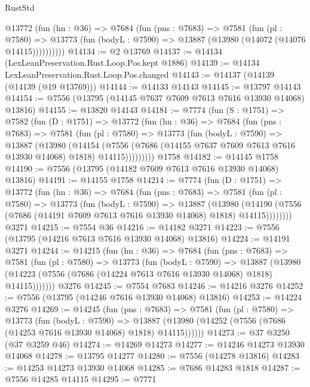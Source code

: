 \begin{lexlean}{RustStd}
\begin{coremodule}
{\begin{coremodule}
{{{{{{{{{{{{{{{{{{{{{{{{{{{{{{{{{{{{{{{{{{{        @13772
          (fun (hn : @36) =>
          @7684
            (fun (pns : @7683) =>
            @7581
              (fun (pl : @7580) =>
              @13773 (fun (bodyL : @7590) => @13887 (@13980 (@14072 (@14076 @14115))))))))))
@14134 := @2 @13769
@14137 := @14134 (LexLeanPreservation.Rust.Loop.Pos.kept @1886)
@14139 := @14134 LexLeanPreservation.Rust.Loop.Pos.changed
@14143 := @14137 (@14139 (@14139 (@19 @13769)))
@14144 := @14133 @14143
@14145 := @13797 @14143
@14154 := @7556 (@13795 (@14145 @7637 @7609 @7613 @7616 @13930 @14068) @13816)
@14155 := @13820 @14143
@14181 := @7774
    (fun (S : @1751) =>
    @7582
      (fun (D : @1751) =>
      @13772
        (fun (hn : @36) =>
        @7684
          (fun (pns : @7683) =>
          @7581
            (fun (pl : @7580) =>
            @13773
              (fun (bodyL : @7590) =>
              @13887
                (@13980
                  (@14154
                    (@7556
                      (@7686 (@14155 @7637 @7609 @7613 @7616 @13930 @14068) @1818)
                      @14115)))))))))
    @1758
@14182 := @14145 @1758
@14190 := @7556 (@13795 (@14182 @7609 @7613 @7616 @13930 @14068) @13816)
@14191 := @14155 @1758
@14214 := @7774
    (fun (D : @1751) =>
    @13772
      (fun (hn : @36) =>
      @7684
        (fun (pns : @7683) =>
        @7581
          (fun (pl : @7580) =>
          @13773
            (fun (bodyL : @7590) =>
            @13887
              (@13980
                (@14190 (@7556 (@7686 (@14191 @7609 @7613 @7616 @13930 @14068) @1818) @14115))))))))
    @3271
@14215 := @7554 @36
@14216 := @14182 @3271
@14223 := @7556 (@13795 (@14216 @7613 @7616 @13930 @14068) @13816)
@14224 := @14191 @3271
@14244 := @14215
    (fun (hn : @36) =>
    @7684
      (fun (pns : @7683) =>
      @7581
        (fun (pl : @7580) =>
        @13773
          (fun (bodyL : @7590) =>
          @13887
            (@13980 (@14223 (@7556 (@7686 (@14224 @7613 @7616 @13930 @14068) @1818) @14115)))))))
    @3276
@14245 := @7554 @7683
@14246 := @14216 @3276
@14252 := @7556 (@13795 (@14246 @7616 @13930 @14068) @13816)
@14253 := @14224 @3276
@14269 := @14245
    (fun (pns : @7683) =>
    @7581
      (fun (pl : @7580) =>
      @13773
        (fun (bodyL : @7590) =>
        @13887 (@13980 (@14252 (@7556 (@7686 (@14253 @7616 @13930 @14068) @1818) @14115))))))
@14273 := @37 @3250 (@37 @3259 @46)
@14274 := @14269 @14273
@14277 := @14246 @14273 @13930 @14068
@14278 := @13795 @14277
@14280 := @7556 (@14278 @13816)
@14283 := @14253 @14273 @13930 @14068
@14285 := @7686 @14283 @1818
@14287 := @7556 @14285 @14115
@14295 := @7771
}}}}}}}}}}}}}}}}}}}}}}}}}}}}}}}}}}}}}}}}}}}
\end{coremodule}}
\end{coremodule}
\end{lexlean}
